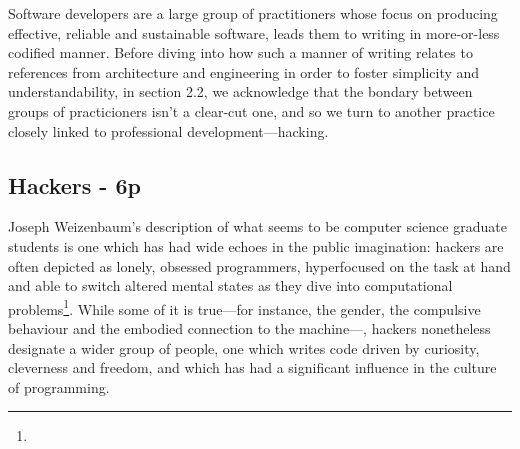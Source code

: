 Software developers are a large group of practitioners whose focus  on producing effective, reliable and sustainable software, leads them to writing in more-or-less codified manner. Before diving into how such a manner of writing relates to references from architecture and engineering in order to foster simplicity and understandability, in section 2.2, we acknowledge that the bondary between groups of practicioners isn't a clear-cut one, and so we turn to another practice closely linked to professional development—hacking.

\subsection{Hackers - 6p}

Joseph Weizenbaum's description of what seems to be computer science graduate students is  one which has had wide echoes in the public imagination: hackers are often depicted as lonely, obsessed programmers, hyperfocused on the task at hand and able to switch altered mental states as they dive into computational problems\footnote{}. While some of it is true—for instance, the gender, the compulsive behaviour and the embodied connection to the machine—, hackers nonetheless designate a wider group of people, one which writes code driven by curiosity, cleverness and freedom, and which has had a significant influence in the culture of programming.


